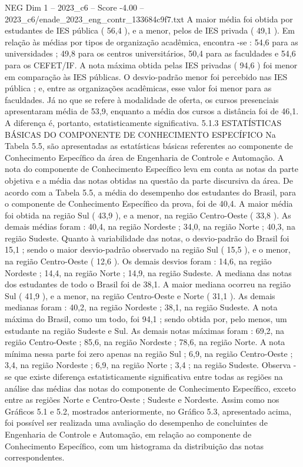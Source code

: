 \begin{textsample}{NEG Dim 1 – 2023\_c6 – Score -4.00 – 2023\_c6/enade\_2023\_eng\_contr\_133684c9f7.txt}
A maior média foi obtida por estudantes de IES pública ( 56,4 ), e a menor, pelos de IES privada ( 49,1 ).
Em relação às médias por tipos de organização acadêmica, encontra -se : 54,6 para as universidades ; 49,8 para os centros universitários, 50,4 para as faculdades e 54,6 para os CEFET/IF.
A nota máxima obtida pelas IES privadas ( 94,6 ) foi menor em comparação às IES públicas.
O desvio-padrão menor foi percebido nas IES pública ; e, entre as organizações acadêmicas, esse valor foi menor para as faculdades.
Já no que se refere à modalidade de oferta, os cursos presenciais apresentaram média de 53,9, enquanto a média dos cursos a distância foi de 46,1.
A diferença é, portanto, estatisticamente significativa. 5.1.3 ESTATÍSTICAS BÁSICAS DO COMPONENTE DE CONHECIMENTO ESPECÍFICO Na Tabela 5.5, são apresentadas as estatísticas básicas referentes ao componente de Conhecimento Específico da área de Engenharia de Controle e Automação.
A nota do componente de Conhecimento Específico leva em conta as notas da parte objetiva e a média das notas obtidas na questão da parte discursiva da área.
De acordo com a Tabela 5.5, a média do desempenho dos estudantes do Brasil, para o componente de Conhecimento Específico da prova, foi de 40,4.
A maior média foi obtida na região Sul ( 43,9 ), e a menor, na região Centro-Oeste ( 33,8 ).
As demais médias foram : 40,4, na região Nordeste ; 34,0, na região Norte ; 40,3, na região Sudeste.
Quanto à variabilidade das notas, o desvio-padrão do Brasil foi 15,1 ; sendo o maior desvio-padrão observado na região Sul ( 15,5 ), e o menor, na região Centro-Oeste ( 12,6 ).
Os demais desvios foram : 14,6, na região Nordeste ; 14,4, na região Norte ; 14,9, na região Sudeste.
A mediana das notas dos estudantes de todo o Brasil foi de 38,1.
A maior mediana ocorreu na região Sul ( 41,9 ), e a menor, na região Centro-Oeste e Norte ( 31,1 ).
As demais medianas foram : 40,2, na região Nordeste ; 38,1, na região Sudeste.
A nota máxima do Brasil, como um todo, foi 94,1 ; sendo obtida por, pelo menos, um estudante na região Sudeste e Sul.
As demais notas máximas foram : 69,2, na região Centro-Oeste ; 85,6, na região Nordeste ; 78,6, na região Norte.
A nota mínima nessa parte foi zero apenas na região Sul ; 6,9, na região Centro-Oeste ; 3,4, na região Nordeste ; 6,9, na região Norte ; 3,4 ; na região Sudeste.
Observa -se que existe diferença estatisticamente significativa entre todas as regiões na análise das médias das notas do componente de Conhecimento Específico, exceto entre as regiões Norte e Centro-Oeste ; Sudeste e Nordeste.
Assim como nos Gráficos 5.1 e 5.2, mostrados anteriormente, no Gráfico 5.3, apresentado acima, foi possível ser realizada uma avaliação do desempenho de concluintes de Engenharia de Controle e Automação, em relação ao componente de Conhecimento Específico, com um histograma da distribuição das notas correspondentes.

\end{textsample}
